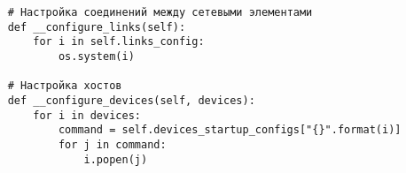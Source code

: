 \begin{verbatim}
    # Настройка соединений между сетевыми элементами
    def __configure_links(self):
        for i in self.links_config:
            os.system(i)

    # Настройка хостов
    def __configure_devices(self, devices):
        for i in devices:
            command = self.devices_startup_configs["{}".format(i)]
            for j in command:
                i.popen(j)

\end{verbatim}

